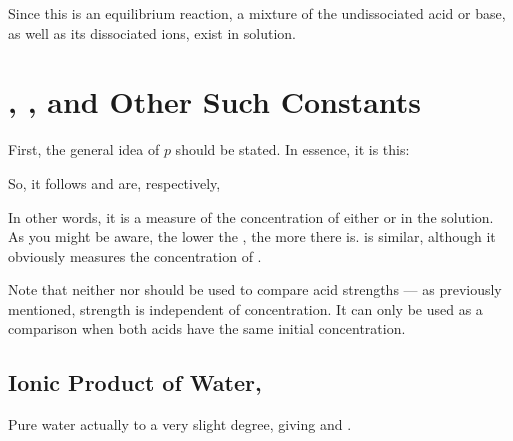 				Since this is an equilibrium reaction, a mixture of the undissociated acid or base, as well as its dissociated ions,
				exist in solution.




	\section{\texorpdfstring{\pH{}}{pH}, \texorpdfstring{\pOH{}}{pOH}, and Other Such Constants}

		First, the general idea of $p$ should be stated. In essence, it is this:

		\eqndiagram{
			\[ pX = -lg(X), \hspace{5mm} X = 10^{-pX} \]
		}

		So, it follows \pH{} and \pOH{} are, respectively,


		In other words, it is a measure of the concentration of either  or  in the solution. As you might be aware, the
		lower the \pH{}, the more  there is. \pOH{} is similar, although it obviously measures the concentration of .

		Note that neither \pH{} nor \pOH{} should be used to compare acid strengths --- as previously mentioned, strength is independent
		of concentration. It can only be used as a comparison when both acids have the same initial concentration.


		\pagebreak
		\subsection{Ionic Product of Water, \texorpdfstring{\Kw{}}{Kw}}

			Pure water actually  to a very slight degree, giving  and .


